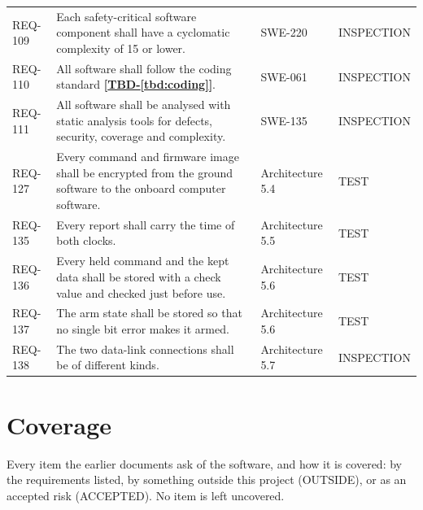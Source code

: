 \documentclass[11pt,a4paper]{article}
\renewcommand{\thesection}{\arabic{section}.0}
\renewcommand{\thesubsection}{\arabic{section}.\arabic{subsection}}
\newcommand{\tbd}[1]{\mbox{\textbf{[\hyperref[tbd:#1]{TBD-\ref*{tbd:#1}}]}}}
\begin{document}
{\begin{xltabular}{\textwidth}{@{}l>{\raggedright\arraybackslash}X>{\raggedright\arraybackslash}p{3.2cm}>{\raggedright\arraybackslash}p{3.0cm}@{}}
REQ-109 & Each safety-critical software component shall have a cyclomatic complexity of 15 or lower. & SWE-220 & INSPECTION \\
REQ-110 & All software shall follow the coding standard \tbd{coding}. & SWE-061 & INSPECTION \\
REQ-111 & All software shall be analysed with static analysis tools for defects, security, coverage and complexity. & SWE-135 & INSPECTION \\
REQ-127 & Every command and firmware image shall be encrypted from the ground software to the onboard computer software. & Architecture 5.4 & TEST \\
REQ-135 & Every report shall carry the time of both clocks. & Architecture 5.5 & TEST \\
REQ-136 & Every held command and the kept data shall be stored with a check value and checked just before use. & Architecture 5.6 & TEST \\
REQ-137 & The arm state shall be stored so that no single bit error makes it armed. & Architecture 5.6 & TEST \\
REQ-138 & The two data-link connections shall be of different kinds. & Architecture 5.7 & INSPECTION \\
\bottomrule
\end{xltabular}}

\appendix
\renewcommand{\thesection}{\Alph{section}}
\renewcommand{\thesubsection}{\Alph{section}.\arabic{subsection}}

\section{Coverage}
Every item the earlier documents ask of the software, and how it is covered:
by the requirements listed, by something outside this project (OUTSIDE), or as
an accepted risk (ACCEPTED). No item is left uncovered.
\end{document}
